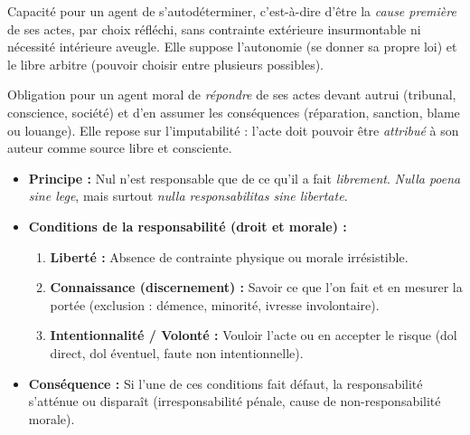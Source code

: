 \documentclass[11pt]{article}
\newcommand{\cle}[1]{{\popxbold\color{popdark}#1}}
\begin{document}
\begin{definition}
Capacité pour un agent de s'autodéterminer, c'est-à-dire d'être la \emph{cause première} de ses actes, par choix réfléchi, sans contrainte extérieure insurmontable ni nécessité intérieure aveugle. Elle suppose l'\cle{autonomie} (se donner sa propre loi) et le \cle{libre arbitre} (pouvoir choisir entre plusieurs possibles).
\end{definition}

\begin{definition}
Obligation pour un agent moral de \emph{répondre} de ses actes devant autrui (tribunal, conscience, société) et d'en assumer les conséquences (réparation, sanction, blame ou louange). Elle repose sur l'\cle{imputabilité} : l'acte doit pouvoir être \emph{attribué} à son auteur comme source libre et consciente.
\end{definition}

\begin{propriete}
\begin{itemize}
    \item \textbf{Principe :} Nul n'est responsable que de ce qu'il a fait \emph{librement}. \emph{Nulla poena sine lege}, mais surtout \emph{nulla responsabilitas sine libertate}.
    \item \textbf{Conditions de la responsabilité (droit et morale) :}
    \begin{enumerate}
        \item \textbf{Liberté :} Absence de contrainte physique ou morale irrésistible.
        \item \textbf{Connaissance (discernement) :} Savoir ce que l'on fait et en mesurer la portée (exclusion : démence, minorité, ivresse involontaire).
        \item \textbf{Intentionnalité / Volonté :} Vouloir l'acte ou en accepter le risque (dol direct, dol éventuel, faute non intentionnelle).
    \end{enumerate}
    \item \textbf{Conséquence :} Si l'une de ces conditions fait défaut, la responsabilité s'atténue ou disparaît (irresponsabilité pénale, cause de non-responsabilité morale).
\end{itemize}
\end{propriete}
\end{document}
